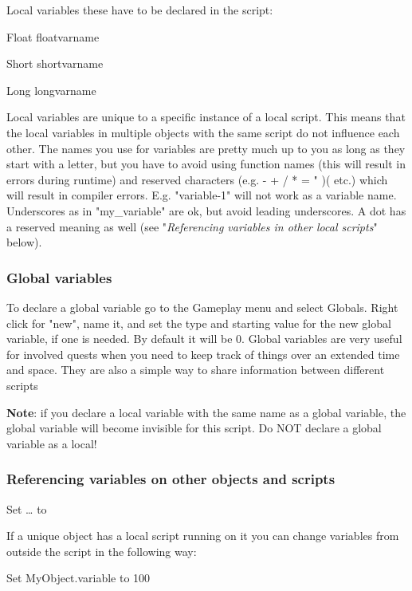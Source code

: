 \documentclass[
]{article}
\begin{document}
Local variables these have to be declared in the script:

Float floatvarname

Short shortvarname

Long longvarname

Local variables are unique to a specific instance of a local script.
This means that the local variables in multiple objects with the same
script do not influence each other. The names you use for variables are
pretty much up to you as long as they start with a letter, but you have
to avoid using function names (this will result in errors during
runtime) and reserved characters (e.g. - + / * = " )( etc.) which will
result in compiler errors. E.g. "variable-1" will not work as a variable
name. Underscores as in "my\_variable" are ok, but avoid leading
underscores. A dot has a reserved meaning as well (see
"\emph{Referencing variables in other local scripts}" below).

\hypertarget{global-variables}{%
\subsubsection{Global variables}\label{global-variables}}

To declare a global variable go to the Gameplay menu and select Globals.
Right click for "new", name it, and set the type and starting value for
the new global variable, if one is needed. By default it will be 0.
Global variables are very useful for involved quests when you need to
keep track of things over an extended time and space. They are also a
simple way to share information between different scripts

\textbf{Note}: if you declare a local variable with the same name as a
global variable, the global variable will become invisible for this
script. Do NOT declare a global variable as a local!

\hypertarget{referencing-variables-on-other-objects-and-scripts}{%
\subsubsection{Referencing variables on other objects and
scripts}\label{referencing-variables-on-other-objects-and-scripts}}

Set \ldots{} to

If a unique object has a local script running on it you can change
variables from outside the script in the following way:

Set MyObject.variable to 100
\end{document}
